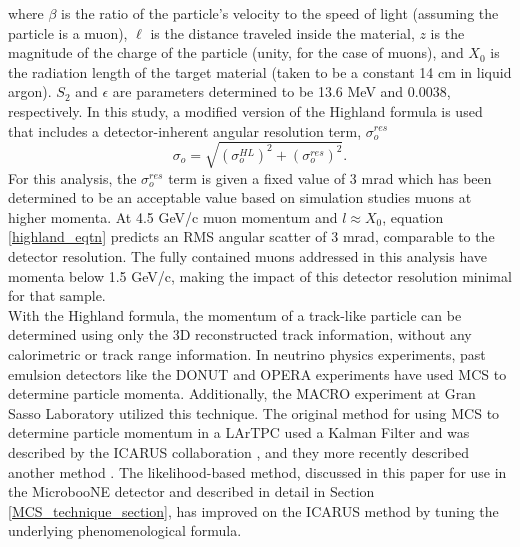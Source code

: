 \documentclass[a4paper,11pt]{article}
\begin{document}
\noindent where $\beta$ is the ratio of the particle's velocity to the speed of light (assuming the particle is a muon), $\ell$ is the distance traveled inside the material, $z$ is the magnitude of the charge of the particle (unity, for the case of muons), and $X_0$ is the radiation length of the target material (taken to be a constant 14 cm in liquid argon). $S_2$ and $\epsilon$ are parameters determined to be 13.6 MeV and 0.0038, respectively. In this study, a modified version of the Highland formula is used that includes a detector-inherent angular resolution term, $\sigma_o^{res}$
\begin{equation}\label{modified_highland_eqtn}
\sigma_{o} = \sqrt{ (\sigma_o^{HL})^2 + (\sigma_o^{res})^2}.%
\end{equation}
For this analysis, the $\sigma_o^{res}$ term is given a fixed value of 3 mrad which has been determined to be an acceptable value based on simulation studies muons at higher momenta. At 4.5 GeV/c muon momentum and $l\approx X_0$, equation \ref{highland_eqtn} predicts an RMS angular scatter of 3 mrad, comparable to the detector resolution. The fully contained muons addressed in this analysis have momenta below 1.5 GeV/c, making the impact of this detector resolution minimal for that sample.\\

With the Highland formula, the momentum of a track-like particle can be determined using only the 3D reconstructed track information, without any calorimetric or track range information. In neutrino physics experiments, past emulsion detectors like the DONUT \cite{DONUT_paper} and OPERA \cite{OPERA_paper} experiments have used MCS to determine particle momenta. Additionally, the MACRO \cite{MACRO_paper} experiment at Gran Sasso Laboratory utilized this technique. The original method for using MCS to determine particle momentum in a LArTPC used a Kalman Filter and was described by the ICARUS collaboration \cite{icarus_mcs_paper}, and they more recently described another method \cite{new_icarus_paper}. The likelihood-based method, discussed in this paper for use in the MicrobooNE detector and described in detail in Section \ref{MCS_technique_section}, has improved on the ICARUS method by tuning the underlying phenomenological formula.
\end{document}
